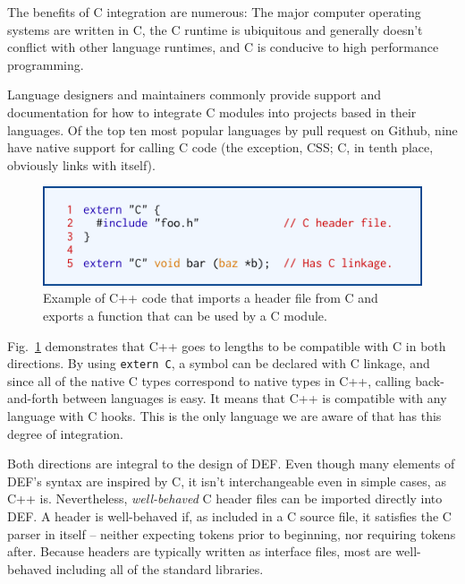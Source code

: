 The benefits of C integration are numerous: The major computer operating systems are written in C,\cite{Linux, Darwin, WindowsKernel} the C runtime is ubiquitous and generally doesn't conflict with other language runtimes, and C is conducive to high performance programming.

Language designers and maintainers commonly provide support and documentation for how to integrate C modules into projects based in their languages.  Of the top ten most popular languages by pull request on Github,\cite{Octoverse} nine have native support for calling C code\cite{JavascriptCiface, PythonCiface, JavaCiface, RubyCiface, PHPCiface, DotNetCiface, GoCiface, CPPCIface} (the exception, CSS; C, in tenth place, obviously links with itself).

\begin{figure}[htbp!]
        \centering
        \includegraphics[scale=0.25]{gfx/extern}
        \caption{Example of C++ code that imports a header file from C and exports a function that can be used by a C module.}
        \label{fig:extern-example}
\end{figure}

Fig.~\ref{fig:extern-example} demonstrates that C++ goes to lengths to be compatible with C in both directions.  By using \texttt{extern \textquotedbl{}C\textquotedbl{}}, a symbol can be declared with C linkage, and since all of the native C types correspond to native types in C++, calling back-and-forth between languages is easy.  It means that C++ is compatible with any language with C hooks.  This is the only language we are aware of that has this degree of integration.

Both directions are integral to the design of DEF.  Even though many elements of DEF's syntax are inspired by C, it isn't interchangeable even in simple cases, as C++ is.  Nevertheless, \textit{well-behaved} C header files can be imported directly into DEF.  A header is well-behaved if, as included in a C source file, it satisfies the C parser in itself -- neither expecting tokens prior to beginning, nor requiring tokens after.  Because headers are typically written as interface files, most are well-behaved including all of the standard libraries.
